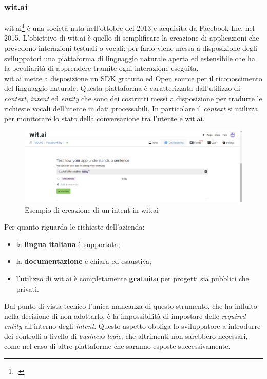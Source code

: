 \subsubsection{wit.ai}
wit.ai\footcite{witai} è una società nata nell'ottobre del 2013 e acquisita da Facebook Inc. nel 2015.
L'obiettivo di wit.ai è quello di semplificare la creazione di applicazioni che prevedono interazioni testuali o vocali; per farlo viene messa a disposizione degli sviluppatori una piattaforma di linguaggio naturale aperta ed estensibile che ha la peculiarità di apprendere tramite ogni interazione eseguita.\\
wit.ai mette a disposizione un \gls{SDK} gratuito ed \gls{Open source} per il riconoscimento del linguaggio
naturale. Questa piattaforma è caratterizzata dall'utilizzo di \emph{context}, \emph{intent} ed \emph{entity} che sono
dei costrutti messi a disposizione per tradurre le richieste vocali dell'utente in dati processabili. In particolare il \emph{context} si utilizza per monitorare lo stato della conversazione tra l'utente e wit.ai.

\begin{figure}[h]
	\centering
	\includegraphics[scale=0.4]{../Immagini/witai_example.png}
	\caption{Esempio di creazione di un intent in wit.ai}
\end{figure}

Per quanto riguarda le richieste dell'azienda:
\begin{itemize}
	\item la \textbf{lingua italiana} è supportata;
	\item la \textbf{documentazione} è chiara ed esaustiva;
	\item l'utilizzo di wit.ai è completamente \textbf{gratuito} per progetti sia pubblici che privati.
\end{itemize}

Dal punto di vista tecnico l'unica mancanza di questo strumento, che ha influito nella decisione di non adottarlo, è la impossibilità di impostare delle \emph{required entity} all'interno degli \emph{intent}. Questo aspetto obbliga lo sviluppatore a introdurre dei controlli a livello di \emph{business logic}, che altrimenti non sarebbero necessari, come nel caso di altre piattaforme che saranno esposte successivamente.

